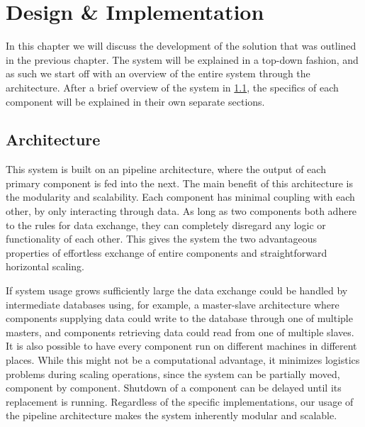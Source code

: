 \chapter{Design \& Implementation}\label{chap:design}
In this chapter we will discuss the development of the solution that was outlined in the previous chapter. The system will be explained in a top-down fashion, and as such we start off with an overview of the entire system through the architecture. After a brief overview of the system in \cref{sec:design_overview}, the specifics of each component will be explained in their own separate sections.

\section{Architecture}\label{sec:design_overview}
This system is built on an pipeline architecture, where the output of each primary component is fed into the next. The main benefit of this architecture is the modularity and scalability. Each component has minimal coupling with each other, by only interacting through data. As long as two components both adhere to the rules for data exchange, they can completely disregard any logic or functionality of each other. This gives the system the two advantageous properties of effortless exchange of entire components and straightforward horizontal scaling.

If system usage grows sufficiently large the data exchange could be handled by intermediate databases using, for example, a master-slave architecture where components supplying data could write to the database through one of multiple masters, and components retrieving data could read from one of multiple slaves. It is also possible to have every component run on different machines in different places. While this might not be a computational advantage, it minimizes logistics problems during scaling operations, since the system can be partially moved, component by component. Shutdown of a component can be delayed until its replacement is running. Regardless of the specific implementations, our usage of the pipeline architecture makes the system inherently modular and scalable.


